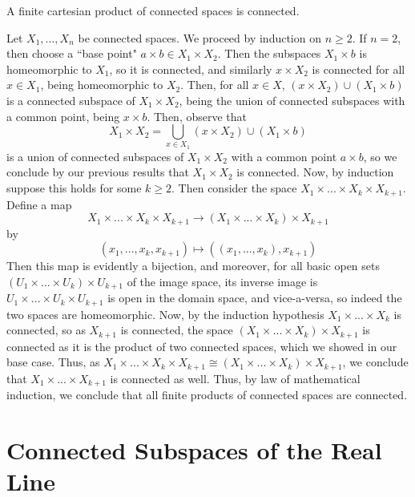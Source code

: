 \documentclass[12pt, a4paper, twoside, openright, titlepage]{book}
\begin{document}
\begin{thm}{}{}
    A finite cartesian product of connected spaces is connected.
\end{thm}
\begin{proof*}{}{}
    Let $X_1,...,X_n$ be connected spaces. We proceed by induction on $n \geq 2$. If $n = 2$, then choose a ``base point" $a\times b \in X_1\times X_2$. Then the subspaces $X_1 \times b$ is homeomorphic to $X_1$, so it is connected, and similarly $x \times X_2$ is connected for all $x \in X_1$, being homeomorphic to $X_2$. Then, for all $x \in X$, $(x\times X_2)\cup (X_1 \times b)$ is a connected subspace of $X_1\times X_2$, being the union of connected subspaces with a common point, being $x\times b$. Then, observe that \begin{equation*}
        X_1 \times X_2 = \bigcup\limits_{x \in X_1}(x\times X_2)\cup(X_1\times b)
    \end{equation*}
    is a union of connected subspaces of $X_1\times X_2$ with a common point $a \times b$, so we conclude by our previous results that $X_1 \times X_2$ is connected. Now, by induction suppose this holds for some $k \geq 2$. Then consider the space $X_1 \times ... \times X_k \times X_{k+1}$. Define a map \begin{equation*}
        X_1\times ... \times X_k\times X_{k+1}\rightarrow (X_1\times ... \times X_k)\times X_{k+1}
    \end{equation*}
    by \begin{equation*}
        (x_1,...,x_k,x_{k+1}) \mapsto ((x_1,...,x_k), x_{k+1})
    \end{equation*}
    Then this map is evidently a bijection, and moreover, for all basic open sets $(U_1\times ... \times U_k)\times U_{k+1}$ of the image space, its inverse image is $U_1 \times ... \times U_k \times U_{k+1}$ is open in the domain space, and vice-a-versa, so indeed the two spaces are homeomorphic. Now, by the induction hypothesis $X_1\times ... \times X_k$ is connected, so as $X_{k+1}$ is connected, the space $(X_1\times ... \times X_k)\times X_{k+1}$ is connected as it is the product of two connected spaces, which we showed in our base case. Thus, as $X_1\times ... \times X_k\times X_{k+1} \cong (X_1\times ... \times X_k)\times X_{k+1}$, we conclude that $X_1\times ...\times X_{k+1}$ is connected as well. Thus, by law of mathematical induction, we conclude that all finite products of connected spaces are connected.
\end{proof*}


\section{Connected Subspaces of the Real Line}
\end{document}

